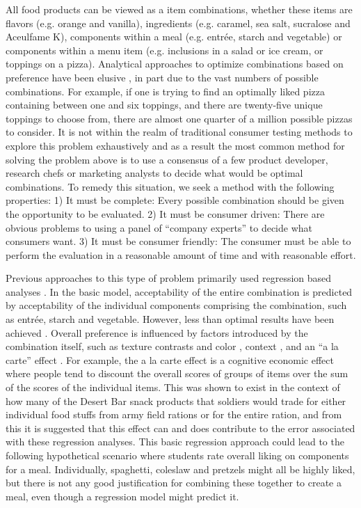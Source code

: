 All food products can be viewed as a item combinations, whether these items are flavors (e.g. orange and vanilla),  ingredients (e.g. caramel, sea salt, sucralose and Aceulfame K), components within a meal (e.g. entrée, starch and vegetable) or components within a menu item (e.g. inclusions in a salad or ice cream, or toppings on a pizza).  Analytical approaches to optimize combinations based on preference have been elusive \citep{Eindhoven1959}, in part due to the vast numbers of possible combinations.  For example, if one is trying to find an optimally liked pizza containing between one and six toppings, and there are twenty-five unique toppings to choose from, there are almost one quarter of a million possible pizzas to consider.  It is not within the realm of traditional consumer testing methods to explore this problem exhaustively and as a result the most common method for solving the problem above is to use a consensus of a few product developer, research chefs or marketing analysts to decide what would be optimal combinations.  To remedy this situation, we seek a method with the following properties: 1) It must be complete: Every possible combination should be given the opportunity to be evaluated.  2) It must be consumer driven: There are obvious problems to using a panel of “company experts” to decide what consumers want.  3) It must be consumer friendly: The consumer must be able to perform the evaluation in a reasonable amount of time and with reasonable effort.  

Previous approaches to this type of problem primarily used regression based analyses \citep{Hedderley1995,Moskowitz1983,Turner1988}.  In the basic model, acceptability of the entire combination is predicted by acceptability of the individual components comprising the combination, such as entrée, starch and vegetable.  However, less than optimal results have been achieved \citep{Eindhoven1959}.  Overall preference is influenced by factors introduced by the combination itself, such as texture contrasts and color \citep{Eindhoven1959,Pilgrim1961}, context \citep{Marshall2003,Niewind1986}, and an “a la carte” effect \citep{Lawless1994}.  For example, the a la carte effect is a cognitive economic effect where people tend to discount the overall scores of groups of items over the sum of the scores of the individual items.  This was shown to exist in the context of how many of the Desert Bar snack products that soldiers would trade for either individual food stuffs from army field rations or for the entire ration, and from this it is suggested that this effect can and does contribute to the error associated with these regression analyses.  This basic regression approach could lead to the following hypothetical scenario where students rate overall liking on components for a meal.  Individually, spaghetti, coleslaw and pretzels might all be highly liked, but there is not any good justification for combining these together to create a meal, even though a regression model might predict it.  

